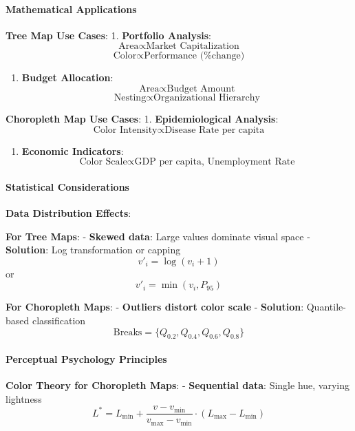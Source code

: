 \documentclass[11pt]{article}
\providecommand{\tightlist}{%
      \setlength{\itemsep}{0pt}\setlength{\parskip}{0pt}}
\begin{document}
\paragraph{Mathematical Applications}\label{mathematical-applications}

\textbf{Tree Map Use Cases}: 1. \textbf{Portfolio Analysis}:
\[\text{Area} \propto \text{Market Capitalization}\]
\[\text{Color} \propto \text{Performance (\% change)}\]

\begin{enumerate}
\def\labelenumi{\arabic{enumi}.}
\setcounter{enumi}{1}
\tightlist
\item
  \textbf{Budget Allocation}:
  \[\text{Area} \propto \text{Budget Amount}\]
  \[\text{Nesting} \propto \text{Organizational Hierarchy}\]
\end{enumerate}

\textbf{Choropleth Map Use Cases}: 1. \textbf{Epidemiological Analysis}:
\[\text{Color Intensity} \propto \text{Disease Rate per capita}\]

\begin{enumerate}
\def\labelenumi{\arabic{enumi}.}
\setcounter{enumi}{1}
\tightlist
\item
  \textbf{Economic Indicators}:
  \[\text{Color Scale} \propto \text{GDP per capita, Unemployment Rate}\]
\end{enumerate}

\paragraph{Statistical Considerations}\label{statistical-considerations}

\textbf{Data Distribution Effects}:

\textbf{For Tree Maps}: - \textbf{Skewed data}: Large values dominate
visual space - \textbf{Solution}: Log transformation or capping
\[v'_i = \log(v_i + 1)\] or \[v'_i = \min(v_i, P_{95})\]

\textbf{For Choropleth Maps}: - \textbf{Outliers distort color scale} -
\textbf{Solution}: Quantile-based classification
\[\text{Breaks} = \{Q_{0.2}, Q_{0.4}, Q_{0.6}, Q_{0.8}\}\]

\paragraph{Perceptual Psychology
Principles}\label{perceptual-psychology-principles}

\textbf{Color Theory for Choropleth Maps}: - \textbf{Sequential data}:
Single hue, varying lightness
\[L^* = L_{\min} + \frac{v - v_{\min}}{v_{\max} - v_{\min}} \cdot (L_{\max} - L_{\min})\]
\end{document}
